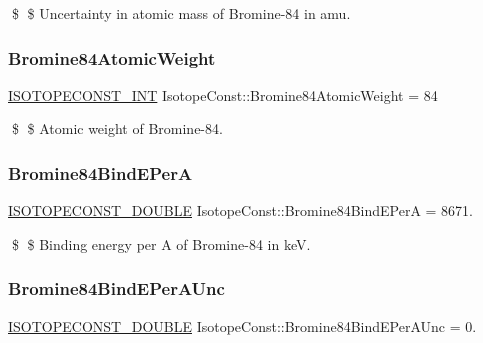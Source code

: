 \$ \$ Uncertainty in atomic mass of Bromine-\/84 in amu. \mbox{\label{group___isotope_const-_bromine-_br84_ga996ea236ba1b5ea9dcaeb0796415899a}} 
\subsubsection{\texorpdfstring{Bromine84\+Atomic\+Weight}{Bromine84AtomicWeight}}
{\footnotesize\ttfamily \mbox{\hyperlink{group___isotope_const-_macros_ga5f18360b3e99483a35c32d789e62621c}{I\+S\+O\+T\+O\+P\+E\+C\+O\+N\+S\+T\+\_\+\+I\+NT}} Isotope\+Const\+::\+Bromine84\+Atomic\+Weight = 84}

\$ \$ Atomic weight of Bromine-\/84. \mbox{\label{group___isotope_const-_bromine-_br84_gacf7a426a7ca6fe61d95479bd251bdfda}} 
\subsubsection{\texorpdfstring{Bromine84\+Bind\+E\+PerA}{Bromine84BindEPerA}}
{\footnotesize\ttfamily \mbox{\hyperlink{group___isotope_const-_macros_ga8f45a7272ce02c0b4c65c44636ed719a}{I\+S\+O\+T\+O\+P\+E\+C\+O\+N\+S\+T\+\_\+\+D\+O\+U\+B\+LE}} Isotope\+Const\+::\+Bromine84\+Bind\+E\+PerA = 8671.}

\$ \$ Binding energy per A of Bromine-\/84 in keV. \mbox{\label{group___isotope_const-_bromine-_br84_ga1e94842b6724a5cb24f1f62003b4c22c}} 
\subsubsection{\texorpdfstring{Bromine84\+Bind\+E\+Per\+A\+Unc}{Bromine84BindEPerAUnc}}
{\footnotesize\ttfamily \mbox{\hyperlink{group___isotope_const-_macros_ga8f45a7272ce02c0b4c65c44636ed719a}{I\+S\+O\+T\+O\+P\+E\+C\+O\+N\+S\+T\+\_\+\+D\+O\+U\+B\+LE}} Isotope\+Const\+::\+Bromine84\+Bind\+E\+Per\+A\+Unc = 0.}

